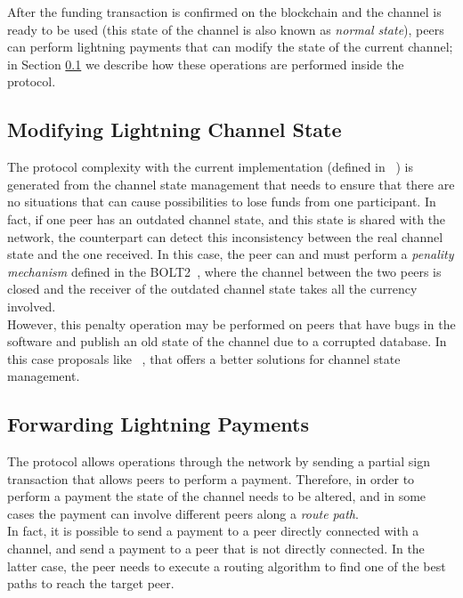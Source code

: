 After the funding transaction is confirmed on the blockchain and the channel is ready to be used (this state of the channel is also known as \emph{normal state}),
peers can perform lightning payments that can modify the state of the current channel; in Section \ref{sec:modify_channel_state} we describe how these operations are performed inside the protocol.

\subsection{Modifying Lightning Channel State}\label{sec:modify_channel_state}

The {\LN} protocol complexity with the current implementation (defined in ~\cite{lightning-bolts})
is generated from the channel state management that needs to ensure that there are no situations that can
cause  possibilities to lose funds from one participant.
In fact, if one peer has an outdated channel state, and this state is shared with the network, the counterpart can
detect this inconsistency between the real channel state and the one received. In this case, the peer can and must
perform  a \emph{penality mechanism} defined in the BOLT2~\cite{bolt2}, where the channel between the two peers
is closed and the receiver of the outdated channel state takes all the currency involved.\\
However, this penalty operation may be performed on peers that have bugs in the software and publish an old state of the
channel due to a corrupted database. In this case proposals like  ~\cite{eltoo},
that offers a better solutions for channel state management.

\subsection{Forwarding Lightning Payments}
\label{sec:lightning_forwarding}

The {\LN} protocol allows operations through the network by sending a partial sign transaction that
allows peers to perform a payment.
Therefore, in order to perform a payment the state of the channel needs to be altered, and in some cases the payment can involve
different peers along a \emph{route path}.\\
In fact, it is possible to send a payment to a peer directly connected with a channel, and send a payment to a peer
that is not directly connected. In the latter case, the peer needs to execute a routing algorithm
to find one of the best paths to reach the target peer.

